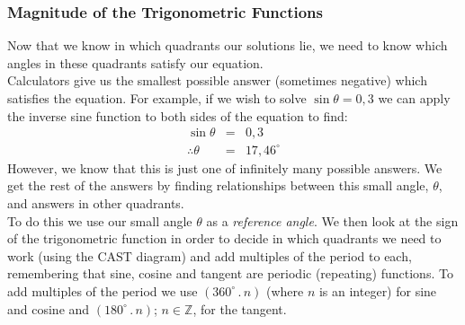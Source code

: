\subsubsection{Magnitude of the Trigonometric Functions}
Now that we know in which quadrants our solutions lie, we need to know which angles in these quadrants satisfy our equation.\\
Calculators give us the smallest possible answer (sometimes negative) which satisfies the equation. For example, if we wish to solve $\sin\theta=0,3$ we can apply the inverse sine function to both sides of the equation to find:
\begin{eqnarray*}
\sin\theta&=&0,3\\
\therefore \theta&=& 17,46^\circ
\end{eqnarray*}
However, we know that this is just one of infinitely many possible answers. We get the rest of the answers by finding relationships between this small angle, $\theta$, and answers in other quadrants.\\
To do this we use our small angle $\theta$ as a \emph{reference angle}. We then look at the sign of the trigonometric function in order to decide in which quadrants we need to work (using the CAST diagram) and add multiples of the period to each, remembering that sine, cosine and tangent are periodic (repeating) functions. To add multiples of the period we use $(360^{\circ}\,.\, n)$ (where $n$ is an integer) for sine and cosine and $(180^{\circ}\,.\, n)$; $n \in \mathbb{Z}$, for the tangent. \\

